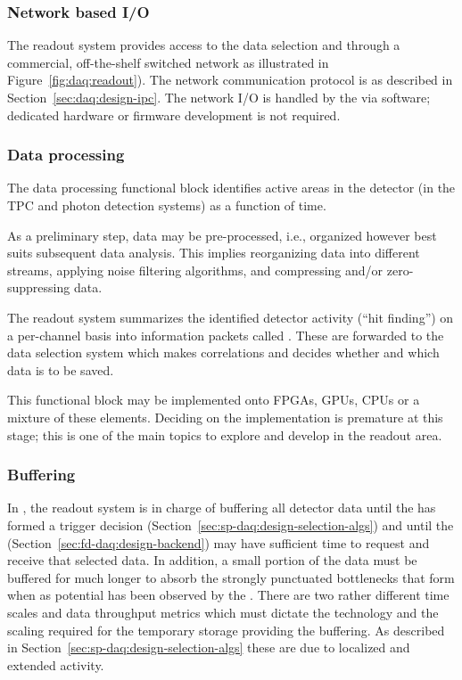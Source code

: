 \subsubsection{Network based I/O}

The readout system provides access to the data selection and  through a commercial, off-the-shelf switched network as illustrated in Figure~\ref{fig:daq:readout}).
The network communication protocol is as described in Section~\ref{sec:daq:design-ipc}.
The network I/O is handled by the  via software; dedicated hardware or firmware development is not required.

\subsubsection{Data processing}

The data processing functional block identifies active areas in the detector (in the TPC and photon detection systems) as a function of time.

As a preliminary step, data may be pre-processed, i.e., organized however best suits subsequent data analysis. This implies reorganizing data into different streams, applying noise filtering algorithms, and compressing and/or zero-suppressing data.

The readout system summarizes the identified detector activity (``hit finding'') on a per-channel basis into information packets called .  These are forwarded to the data selection system which makes correlations and decides whether and which data is to be saved.

This functional block may be implemented onto FPGAs, GPUs, CPUs or a mixture of these elements.
Deciding on the implementation is premature at this stage; this is one of the main topics to explore and develop in the readout area.

\subsubsection{Buffering}

In , the readout system is in charge of buffering all detector data until the  has formed a trigger decision (Section~\ref{sec:sp-daq:design-selection-algs}) and until the  (Section~\ref{sec:fd-daq:design-backend}) may have sufficient time to request and receive that selected data. 
In addition, a small portion of the data must be buffered for much longer to absorb the strongly punctuated bottlenecks that form when as potential  has been observed by the .
There are two rather different time scales and data throughput metrics which must dictate the technology and the scaling required for the temporary storage providing the buffering.
As described in Section~\ref{sec:sp-daq:design-selection-algs} these are due to localized and extended activity.

